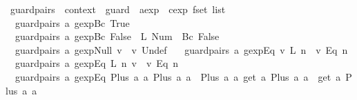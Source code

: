\begin{isabellebody}
\endisatagproof
{\isafoldproof}%
%
\isadelimproof
\isanewline
%
\endisadelimproof
\isanewline
{}\isamarkupfalse%
\ guard{}pairs\ {\isacharcolon}{\isacharcolon}\ {\isachardoublequoteopen}context\ {\isasymRightarrow}\ guard\ {\isasymRightarrow}\ {\isacharparenleft}aexp\ {\isasymtimes}\ cexp\ fset{\isacharparenright}\ list{\isachardoublequoteclose}\ \isanewline
\ \ {\isachardoublequoteopen}guard{}pairs\ a\ {\isacharparenleft}gexp{\isachardot}Bc\ True{\isacharparenright}\ {\isacharequal}\ {\isacharbrackleft}{\isacharbrackright}{\isachardoublequoteclose}\ {\isacharbar}\isanewline
\ \ {\isachardoublequoteopen}guard{}pairs\ a\ {\isacharparenleft}gexp{\isachardot}Bc\ False{\isacharparenright}\ {\isacharequal}\ {\isacharbrackleft}{\isacharparenleft}L\ {\isacharparenleft}Num\ {}{\isacharparenright}{\isacharcomma}\ {\isacharbraceleft}{\isacharbar}Bc\ False{\isacharbar}{\isacharbraceright}{\isacharparenright}{\isacharbrackright}{\isachardoublequoteclose}\ {\isacharbar}\isanewline
\isanewline
\ \ {\isachardoublequoteopen}guard{}pairs\ a\ {\isacharparenleft}gexp{\isachardot}Null\ v{\isacharparenright}\ {\isacharequal}\ {\isacharbrackleft}{\isacharparenleft}v{\isacharcomma}\ {\isacharbraceleft}{\isacharbar}Undef{\isacharbar}{\isacharbraceright}{\isacharparenright}{\isacharbrackright}{\isachardoublequoteclose}\ {\isacharbar}\isanewline
\isanewline
\ \ {\isachardoublequoteopen}guard{}pairs\ a\ {\isacharparenleft}gexp{\isachardot}Eq\ v\ {\isacharparenleft}L\ n{\isacharparenright}{\isacharparenright}\ {\isacharequal}\ {\isacharbrackleft}{\isacharparenleft}v{\isacharcomma}\ {\isacharbraceleft}{\isacharbar}Eq\ n{\isacharbar}{\isacharbraceright}{\isacharparenright}{\isacharbrackright}{\isachardoublequoteclose}\ {\isacharbar}\isanewline
\ \ {\isachardoublequoteopen}guard{}pairs\ a\ {\isacharparenleft}gexp{\isachardot}Eq\ {\isacharparenleft}L\ n{\isacharparenright}\ v{\isacharparenright}\ {\isacharequal}\ {\isacharbrackleft}{\isacharparenleft}v{\isacharcomma}\ {\isacharbraceleft}{\isacharbar}Eq\ n{\isacharbar}{\isacharbraceright}{\isacharparenright}{\isacharbrackright}{\isachardoublequoteclose}\ {\isacharbar}\isanewline
\ \ {\isachardoublequoteopen}guard{}pairs\ a\ {\isacharparenleft}gexp{\isachardot}Eq\ {\isacharparenleft}Plus\ a{}\ a{}{\isacharparenright}\ {\isacharparenleft}Plus\ a{}\ a{}{\isacharparenright}{\isacharparenright}\ {\isacharequal}\ {\isacharbrackleft}{\isacharparenleft}{\isacharparenleft}Plus\ a{}\ a{}{\isacharparenright}{\isacharcomma}\ {\isacharparenleft}get\ a\ {\isacharparenleft}Plus\ a{}\ a{}{\isacharparenright}{\isacharparenright}\ {\isacharbar}{\isasymunion}{\isacharbar}\ {\isacharparenleft}get\ a\ {\isacharparenleft}Plus\ a{}\ a{}{\isacharparenright}{\isacharparenright}{\isacharparenright}{\isacharcomma}\isanewline

\end{isabellebody}
